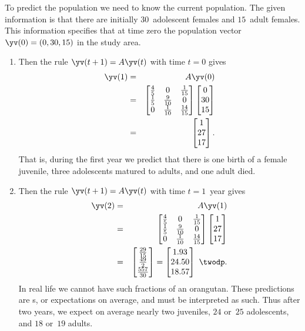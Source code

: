 \begin{example}[orangutans]
\begin{solution}
To predict the population we need to know the current population.
The given information is that there are initially \(30\)~adolescent females and \(15\)~adult females. 
This information specifies that at time zero the population vector \(\yv(0)=(0,30,15)\) in the study area.
\begin{enumerate}
\item Then the rule \(\yv(t+1)=A\yv(t)\) with time \(t=0\) gives
\begin{eqnarray*}
\yv(1)&=&A\yv(0)
\\&=&\begin{bmatrix} \frac45&0&\frac1{15}
\\\frac15&\frac9{10}&0
\\0&\frac1{10}&\frac{14}{15} \end{bmatrix}\begin{bmatrix} 0\\30\\15 \end{bmatrix}
\\&=&\begin{bmatrix} 1\\27\\17 \end{bmatrix}.
\end{eqnarray*}
That is, during the first year we predict that there is one birth of a female juvenile, three adolescents matured to adults, and one adult died. 

\item Then the rule \(\yv(t+1)=A\yv(t)\) with time \(t=1\)~year gives
\begin{eqnarray*}
\yv(2)&=&A\yv(1)
\\&=&\begin{bmatrix} \frac45&0&\frac1{15}
\\\frac15&\frac9{10}&0
\\0&\frac1{10}&\frac{14}{15} \end{bmatrix}\begin{bmatrix} 1\\27\\17 \end{bmatrix}
\\&=&\begin{bmatrix} \frac{29}{15}\\\frac{49}2\\\frac{557}{30} \end{bmatrix}=\begin{bmatrix} 1.93\\24.50\\18.57 \end{bmatrix}\ \twodp.
\end{eqnarray*}
In real life we cannot have such fractions of an orangutan.
These predictions are s, or expectations on average, and must be interpreted as such. 
Thus after two years, we expect on average nearly two juveniles, \(24\) or~\(25\) adolescents, and \(18\) or~\(19\) adults.


\end{enumerate}
\end{solution}
\end{example}
